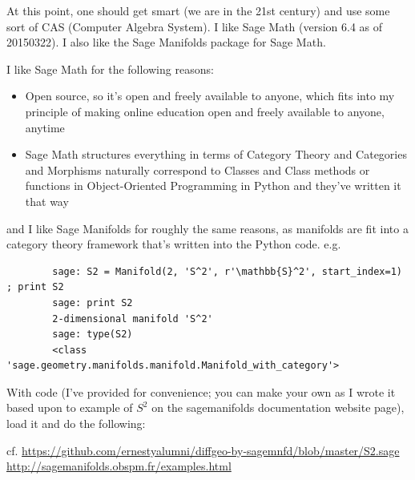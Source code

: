 \documentclass[10pt]{amsart}
\begin{document}
\begin{multicols*}{2}
	At this point, one should get smart (we are in the 21st century) and use some sort of CAS (Computer Algebra System). I like Sage Math (version 6.4 as of 20150322).  I also like the Sage Manifolds package for Sage Math.  
	
	I like Sage Math for the following reasons:
	\begin{itemize}
		\item Open source, so it’s open and freely available to anyone, which fits into my principle of making online education open and freely available to anyone, anytime
		\item Sage Math structures everything in terms of Category Theory and Categories and Morphisms naturally correspond to Classes and Class methods or functions in Object-Oriented Programming in Python and they’ve written it that way
	\end{itemize}
	and I like Sage Manifolds for roughly the same reasons, as manifolds are fit into a category theory framework that’s written into the Python code.  e.g.
	
	{\small \begin{verbatim}
		sage: S2 = Manifold(2, 'S^2', r'\mathbb{S}^2', start_index=1) ; print S2
		sage: print S2
		2-dimensional manifold 'S^2'
		sage: type(S2)
		<class 'sage.geometry.manifolds.manifold.Manifold_with_category'>
		\end{verbatim}}
	
	With code (I’ve provided for convenience; you can make your own as I wrote it based upon to example of $S^2$ on the sagemanifolds documentation website page), load it and do the following:
	
	cf. \url{https://github.com/ernestyalumni/diffgeo-by-sagemnfd/blob/master/S2.sage} \\
	\url{http://sagemanifolds.obspm.fr/examples.html}
	

\end{multicols*}
\end{document}
